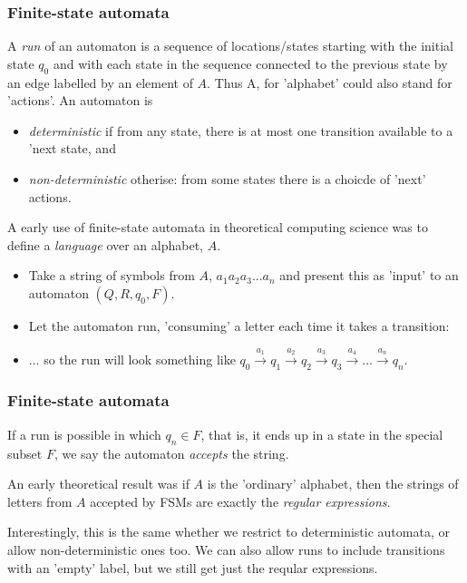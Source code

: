 \documentclass[10pt, hyperref={pdfpagelabels=false}]{beamer}
\begin{document}
\begin{frame}
\frametitle{Finite-state automata}
A \emph{run} of an automaton is a sequence of locations/states starting with the initial state $q_0$ and with each state in the sequence connected to the previous state by an edge labelled by an element of $A$. Thus A, for 'alphabet' could also stand for 'actions'. An automaton is
\begin{itemize}
\item \emph{deterministic} if from any state, there is at most one transition available to a 'next state, and
\item \emph{non-deterministic} otherise: from some states there is a choicde of 'next' actions.
\end{itemize}

A early use of finite-state automata in theoretical computing science was to define a \emph{language} over an alphabet, $A$. 
\begin{itemize}
\item Take a string of symbols from $A$, $a_1a_2a_3...a_n$ and present this as 'input' to an automaton $(Q, R, q_0, F)$. 
\item Let the automaton run, 'consuming' a letter each time it takes a transition: 
\item ... so the run will look something like $q_0 \stackrel{a_1}{\longrightarrow} q_1\stackrel{a_2}{\longrightarrow} q_2\stackrel{a_3}{\longrightarrow}q_3\stackrel{a_4}{\longrightarrow} ... \stackrel{a_n}{\longrightarrow} q_n$. 
\end{itemize}
\end{frame}

\begin{frame}
\frametitle{Finite-state automata}
If a run is possible in which $q_n \in F$, that is, it ends up in a state in the special subset $F$, we say the automaton \emph{accepts} the string.

An early theoretical result was if $A$ is the 'ordinary' alphabet, then the strings of letters from $A$ accepted by FSMs are exactly the \emph{regular expressions}.

Interestingly, this is the same whether we restrict to deterministic automata, or allow non-deterministic ones too. We can also allow runs to include transitions with an 'empty' label, but we still get just the reqular expressions.
\end{frame}
\end{document}
